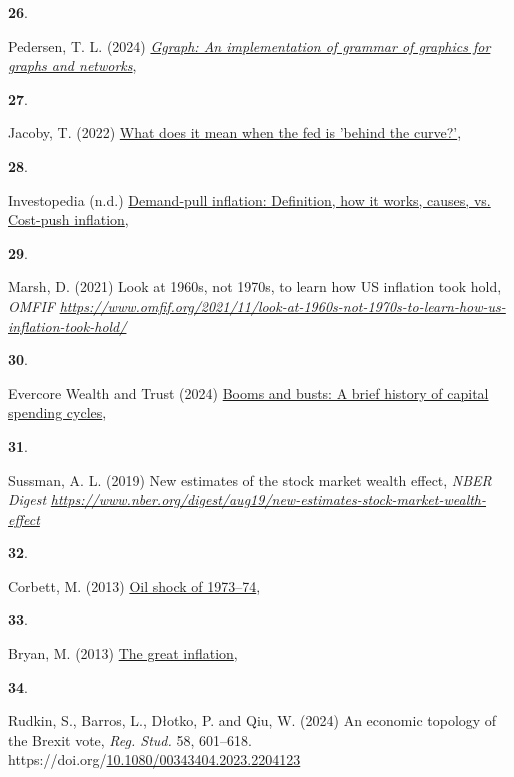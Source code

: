 \documentclass[10pt, letterpaper]{article}
\newlength{\cslhangindent}
\newlength{\csllabelwidth}
\newenvironment{CSLReferences}[2]
  {\begin{list}{}{%
    \setlength{\itemindent}{0pt}
    \setlength{\leftmargin}{0pt}
    \setlength{\parsep}{0pt}
    \ifodd #1
      \setlength{\leftmargin}{\cslhangindent}
      \setlength{\itemindent}{-1\cslhangindent}
    \fi
    \setlength{\itemsep}{#2\baselineskip}}}
  {\end{list}}
\newcommand{\CSLLeftMargin}[1]{\parbox[t]{\csllabelwidth}{\strut#1\strut}}
\newcommand{\CSLRightInline}[1]{\parbox[t]{\linewidth - \csllabelwidth}{\strut#1\strut}}
\begin{document}
\begin{CSLReferences}{1}{0}
\CSLLeftMargin{\textbf{26}. }%
\CSLRightInline{Pedersen, T. L. (2024)
\emph{\href{https://CRAN.R-project.org/package=ggraph}{Ggraph: An
implementation of grammar of graphics for graphs and networks}}, }

\CSLLeftMargin{\textbf{27}. }%
\CSLRightInline{Jacoby, T. (2022)
\href{https://www.nasdaq.com/articles/what-does-it-mean-when-the-fed-is-behind-the-curve}{What
does it mean when the fed is 'behind the curve?'}, }

\CSLLeftMargin{\textbf{28}. }%
\CSLRightInline{Investopedia (n.d.)
\href{https://www.investopedia.com/terms/d/demandpullinflation.asp}{Demand-pull
inflation: Definition, how it works, causes, vs. Cost-push inflation}, }

\CSLLeftMargin{\textbf{29}. }%
\CSLRightInline{Marsh, D. (2021) Look at 1960s, not 1970s, to learn how
{US} inflation took hold, \emph{OMFIF}
\emph{\url{https://www.omfif.org/2021/11/look-at-1960s-not-1970s-to-learn-how-us-inflation-took-hold/}}}

\CSLLeftMargin{\textbf{30}. }%
\CSLRightInline{Evercore Wealth and Trust (2024)
\href{https://evercorewealthandtrust.com/booms-and-busts-a-brief-history-of-capital-spending-cycles/}{Booms
and busts: A brief history of capital spending cycles}, }

\CSLLeftMargin{\textbf{31}. }%
\CSLRightInline{Sussman, A. L. (2019) New estimates of the stock market
wealth effect, \emph{NBER Digest}
\emph{\url{https://www.nber.org/digest/aug19/new-estimates-stock-market-wealth-effect}}}

\CSLLeftMargin{\textbf{32}. }%
\CSLRightInline{Corbett, M. (2013)
\href{https://www.federalreservehistory.org/essays/oil-shock-of-1973-74}{Oil
shock of 1973--74}, }

\CSLLeftMargin{\textbf{33}. }%
\CSLRightInline{Bryan, M. (2013)
\href{https://www.federalreservehistory.org/essays/great-inflation}{The
great inflation}, }

\CSLLeftMargin{\textbf{34}. }%
\CSLRightInline{Rudkin, S., Barros, L., Dłotko, P. and Qiu, W. (2024) An
economic topology of the {B}rexit vote, \emph{Reg. Stud.} 58, 601--618.
https://doi.org/\href{https://doi.org/10.1080/00343404.2023.2204123}{10.1080/00343404.2023.2204123}}

\end{CSLReferences}
\end{document}
